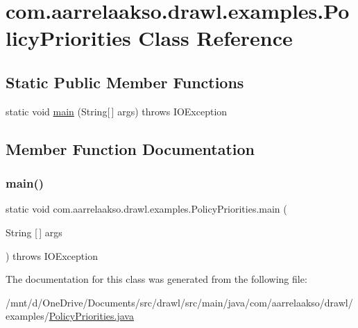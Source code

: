 \hypertarget{classcom_1_1aarrelaakso_1_1drawl_1_1examples_1_1_policy_priorities}{}\section{com.\+aarrelaakso.\+drawl.\+examples.\+Policy\+Priorities Class Reference}
\label{classcom_1_1aarrelaakso_1_1drawl_1_1examples_1_1_policy_priorities}
\subsection*{Static Public Member Functions}
\begin{DoxyCompactItemize}
\item 
static void \hyperlink{classcom_1_1aarrelaakso_1_1drawl_1_1examples_1_1_policy_priorities_a3c47ad7b27f726ce4eeed90d57b7699b}{main} (String\mbox{[}$\,$\mbox{]} args)  throws I\+O\+Exception     
\end{DoxyCompactItemize}


\subsection{Member Function Documentation}
\mbox{\label{classcom_1_1aarrelaakso_1_1drawl_1_1examples_1_1_policy_priorities_a3c47ad7b27f726ce4eeed90d57b7699b}} 
\subsubsection{\texorpdfstring{main()}{main()}}
{\footnotesize\ttfamily static void com.\+aarrelaakso.\+drawl.\+examples.\+Policy\+Priorities.\+main (\begin{DoxyParamCaption}\item[{String \mbox{[}$\,$\mbox{]}}]{args }\end{DoxyParamCaption}) throws I\+O\+Exception\hspace{0.3cm}{\ttfamily [static]}}



The documentation for this class was generated from the following file\+:\begin{DoxyCompactItemize}
\item 
/mnt/d/\+One\+Drive/\+Documents/src/drawl/src/main/java/com/aarrelaakso/drawl/examples/\hyperlink{_policy_priorities_8java}{Policy\+Priorities.\+java}\end{DoxyCompactItemize}
